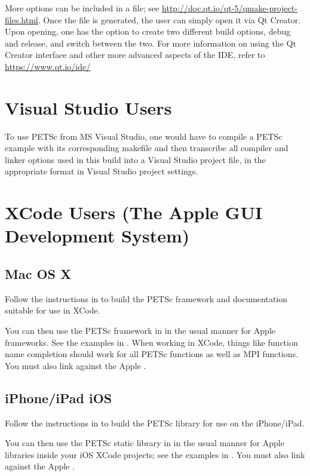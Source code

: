 {{{More options can be included in a  file; see \url{http://doc.qt.io/qt-5/qmake-project-files.html}. 
Once the  file is generated, the user can simply open it via Qt Creator. 
Upon opening, one has the option to create two different build options, debug and release, and switch between the two. 
For more information on using the Qt Creator interface and other more advanced aspects of the IDE, refer to \url{https://www.qt.io/ide/}

\section{Visual Studio Users} 

To use PETSc from MS Visual Studio, one would have to compile a PETSc example with its corresponding makefile and then transcribe all compiler and linker options used in this build into a Visual Studio project file, in the appropriate format in Visual Studio project settings. 

\section{XCode Users (The Apple GUI Development System)} 
\subsection{Mac OS X}

Follow the instructions in  to build the PETSc framework and documentation suitable for use in XCode.

You can then use the PETSc framework in  in the usual manner for Apple frameworks.
See the examples in .  When working in XCode, things like function name completion should work for all PETSc functions as well as MPI functions. You must also link against the Apple .

\subsection{iPhone/iPad iOS}

Follow the instructions in  to build the PETSc library for use on the iPhone/iPad.

You can then use the PETSc static library in  in the usual manner for Apple libraries inside your iOS XCode projects; see the examples in .  You must also link against the Apple .

}}}
